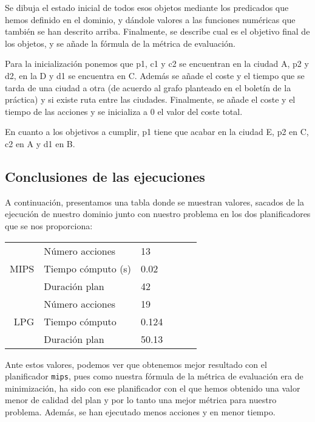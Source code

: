 \documentclass[a4paper]{article}
\begin{document}
Se dibuja el estado inicial de todos esos objetos mediante los predicados que hemos definido en el dominio, y dándole valores a las funciones numéricas que también se han descrito arriba. Finalmente, se describe cual es el objetivo final de los objetos, y se añade la fórmula de la métrica de evaluación.

Para la inicialización ponemos que p1, c1 y c2 se encuentran en la ciudad A, p2 y d2, en la D y d1 se encuentra en C. Además se añade el coste y el tiempo que se tarda de una ciudad a otra (de acuerdo al grafo planteado en el boletín de la práctica) y si existe ruta entre las ciudades. Finalmente, se añade el coste y el tiempo de las acciones y se inicializa a 0 el valor del coste total.

En cuanto a los objetivos a cumplir, p1 tiene que acabar en la ciudad E, p2 en C, c2 en A y d1 en B.
\subsection{Conclusiones de las ejecuciones}
A continuación, presentamos una tabla donde se muestran valores, sacados de la ejecución de nuestro dominio junto con nuestro problema en los dos planificadores que se nos proporciona:\\
\begin{table}[H]\label{concl}
\begin{center}
\begin{tabular}{r|c| l|l|l|l|}
\multirow{3}{*}{MIPS} & \multicolumn{1}{l|}{Número acciones} & \multicolumn{1}{l|}{13}\\\cline{2-3}
                     & \multicolumn{1}{l|}{Tiempo cómputo (s)} & \multicolumn{1}{l|}{0.02}\\\cline{2-3}
                     & \multicolumn{1}{l|}{Duración plan} & \multicolumn{1}{l|}{42}\\\hline \hline
\multirow{3}{*}{LPG} & \multicolumn{1}{l|}{Número acciones} & \multicolumn{1}{l|}{19}\\\cline{2-3}
                     & \multicolumn{1}{l|}{Tiempo cómputo} & \multicolumn{1}{l|}{0.124}\\\cline{2-3}
                     & \multicolumn{1}{l|}{Duración plan} & \multicolumn{1}{l|}{50.13}\\\hline
\end{tabular}
\end{center}
\end{table}
Ante estos valores, podemos ver que obtenemos mejor resultado con el planificador \texttt{mips}, pues como nuestra fórmula de la métrica de evaluación era de minimización, ha sido con ese planificador con el que hemos obtenido una valor menor de calidad del plan y por lo tanto una mejor métrica para nuestro problema. Además, se han ejecutado menos acciones y en menor tiempo.
\end{document}
